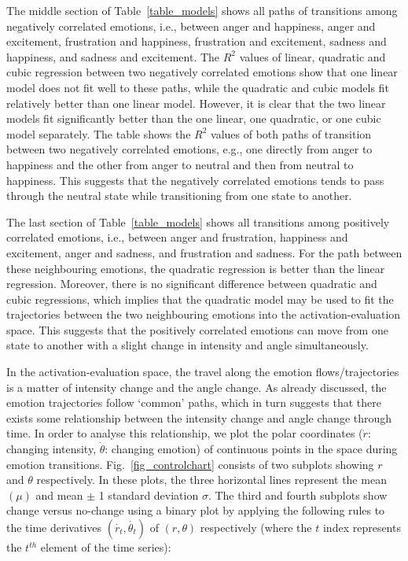 \documentclass[10pt,journal,cspaper,compsoc]{IEEEtran}
\begin{document}
The middle section of Table~\ref{table_models} shows all paths of transitions among negatively correlated emotions, i.e., between anger and happiness, anger and excitement, frustration and happiness, frustration and excitement, sadness and happiness, and sadness and excitement. The $R^{2}$ values of linear, quadratic and cubic regression between two negatively correlated emotions show that one linear model does not fit well to these paths, while the quadratic and cubic models fit relatively better than one linear model. However, it is clear that the two linear models fit significantly better than the one linear, one quadratic, or one cubic model separately. The table shows the $R^{2}$ values of both paths of transition between two negatively correlated emotions, e.g., one directly from anger to happiness and the other from anger to neutral and then from neutral to happiness. This suggests that the negatively correlated emotions tends to pass through the neutral state while transitioning from one state to another.

The last section of Table~\ref{table_models} shows all transitions among positively correlated emotions, i.e., between anger and frustration, happiness and excitement, anger and sadness, and frustration and sadness. For the path between these neighbouring emotions, the quadratic regression is better than the linear regression. Moreover, there is no significant difference between quadratic and cubic regressions, which implies that the quadratic model may be used to fit the trajectories between the two neighbouring emotions into the activation-evaluation space. This suggests that the positively correlated emotions can move from one state to another with a slight change in intensity and angle simultaneously.

In the activation-evaluation space, the travel along the emotion flows/trajectories is a matter of intensity change and the angle change. As already discussed, the emotion trajectories follow `common' paths, which in turn suggests that there exists some relationship between the intensity change and angle change through time. In order to analyse this relationship, we plot the polar coordinates ($\dot{r}$: changing intensity, $\dot{\theta}$: changing emotion) of continuous points in the space during emotion transitions. Fig.~\ref{fig_controlchart} consists of two subplots showing $r$ and $\theta$ respectively. In these plots, the three horizontal lines represent the mean $(\mu)$ and mean $\pm$ 1 standard deviation $\sigma$. The third and fourth subplots show change versus no-change using a binary plot by applying the following rules to the time derivatives $(\dot{r_{t}},\dot{\theta_{t}})$ of $(r,\theta)$ respectively (where the $t$ index represents the $t^{th}$ element of the time series):
\end{document}

